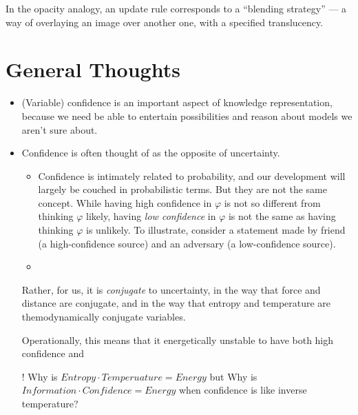 \documentclass{article}
\begin{document}




In the opacity analogy, an update rule corresponds to a ``blending strategy'' --- a way of overlaying an image over another one, with a specified translucency.


\newpage
\printbibliography


\appendix
\section{General Thoughts}

\begin{itemize}
\item    
(Variable) confidence is an important aspect of knowledge representation, because we need be able to entertain possibilities and reason about models we aren't sure about.

\item
Confidence is often thought of as the opposite of uncertainty. 

\begin{itemize}
    \item
    Confidence is intimately related to probability, and our development will largely be couched in probabilistic terms. But they are not the same concept.
    While having high confidence in $\varphi$ is not so different from thinking $\varphi$ likely, having \emph{low confidence} in $\varphi$ is not the same as having thinking $\varphi$ is unlikely.
    To illustrate, consider a statement made by friend (a high-confidence source) and an adversary (a low-confidence source).
    
    \item
\end{itemize}

Rather, for us, it is \emph{conjugate} to uncertainty, in the way that force and distance are conjugate, and in the way that entropy and temperature are themodynamically conjugate variables.

Operationally, this means that it energetically unstable to have both high confidence and 

\begin{wip}
! Why is $\mathit{Entropy} \cdot \mathit{Temperuature} = \mathit{Energy}$ but 
 Why is $\mathit{Information} \cdot \mathit{Confidence} = \mathit{Energy}$ when confidence is like inverse temperature?
\end{wip}


\end{itemize}
\end{document}
